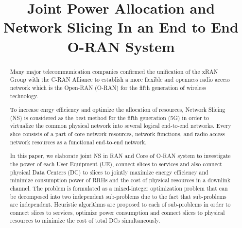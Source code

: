 \documentclass[conference]{IEEEtran}
\begin{document}
\title{Joint Power Allocation and Network Slicing In an End to End O-RAN System
}

\author{
\and
{}

}

\maketitle

\begin{abstract}
Many major telecommunication companies confirmed the unification of the xRAN Group with the C-RAN Alliance to establish a more flexible and openness radio access network which is the Open-RAN 
(O-RAN) for the fifth generation of wireless technology. 


To increase enrgy efficiency and optimize the allocation of resources, Network Slicing (NS) is considered as the best method for the fifth generation (5G) in order to virtualize the common physical network into several logical end-to-end networks. Every slice consists of a part of core network resources, network functions, and radio access network resources as a functional end-to-end network. 


In this paper, we elaborate joint NS in RAN and Core of O-RAN system to investigate the power 
of each User Equipment (UE), connect slices to services and also connect physical Data Centers (DC) to slices to jointly maximize energy efficiency and minimize consumption power of RRHs and the cost of  physical resources in a downlink channel. The problem is formulated as a mixed-integer optimization problem that can be decomposed into two independent sub-problems due to the fact that sub-problems are independent. 
Heuristic algorithms are proposed to each of sub-problems in order to connect slices to services, optimize power consumption and connect slices to physical resources to minimize the cost of total DCs simultaneously.
\end{abstract}
\end{document}
